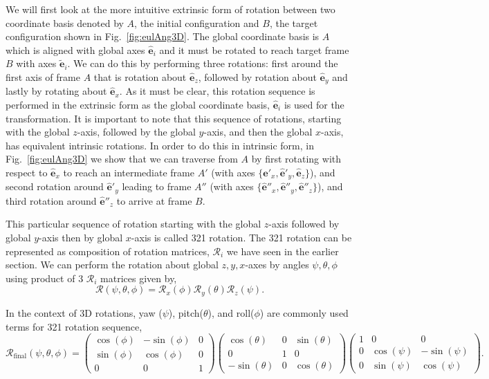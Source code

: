 \documentclass{article}
\def\eh{\hat{\mathbf{e}}}
\def\et{\tilde{\mathbf{e}}}
\def\R{\mathcal{R}}
\begin{document}
We will first look at the more intuitive extrinsic form of rotation between two coordinate basis denoted by $A$, the initial configuration and $B$, the target configuration shown in Fig.~\ref{fig:eulAng3D}. The global coordinate basis is $A$ which is aligned with global axes $\eh_i$ and it must be rotated to reach target frame $B$ with axes $\et_i$. We can do this by performing three rotations: first around the first axis of frame $A$ that is rotation about $\eh_z$, followed by rotation about $\eh_y$ and lastly by rotating about $\eh_x$. As it must be clear, this rotation sequence is performed in the extrinsic form as the global coordinate basis, $\eh_i$ is used for the transformation. It is important to note that this sequence of rotations, starting with the global $z$-axis, followed by the global $y$-axis, and then the global $x$-axis, has equivalent intrinsic rotations. In order to do this in intrinsic form, in Fig.~\ref{fig:eulAng3D} we show that we can traverse from $A$ by first rotating with respect to $\eh_x$ to reach an intermediate frame $A'$ (with axes $\{ \eh'_x, \eh'_y, \eh_z \}$), and second rotation around $\eh'_y$ leading to frame $A''$ (with axes $\{ \eh''_x, \eh''_y, \eh''_z \}$), and third rotation around $\eh''_z$ to arrive at frame $B$.

This particular sequence of rotation starting with the global $z$-axis followed by global $y$-axis then by global $x$-axis is called 321 rotation. The 321 rotation can be represented as composition of rotation matrices, $\R_i$ we have seen in the earlier section. We can perform the rotation about global $z, y, x$-axes by angles $\psi, \theta, \phi$ using product of 3 $\R_i$ matrices given by,
\[
  \R (\psi, \theta, \phi) = \R_x(\phi) \R_y(\theta) \R_z(\psi).
\]

\noindent In the context of 3D rotations, yaw (\( \psi \)), pitch(\( \theta \)), and roll(\( \phi \)) are commonly used terms for 321 rotation sequence,
\[
  \R_{\text{final}} (\psi, \theta, \phi) = 
\begin{pmatrix} 
    \cos(\phi) & -\sin(\phi) & 0 \\
    \sin(\phi) & \cos(\phi) & 0 \\
    0 & 0 & 1 
\end{pmatrix}
\begin{pmatrix}
\cos(\theta) & 0 & \sin(\theta) \\
0 & 1 & 0 \\
-\sin(\theta) & 0 & \cos(\theta)
\end{pmatrix}
\begin{pmatrix} 
    1 & 0 & 0 \\
    0 & \cos(\psi) & -\sin(\psi) \\
    0 & \sin(\psi) & \cos(\psi)
\end{pmatrix}.
\]
\end{document}
